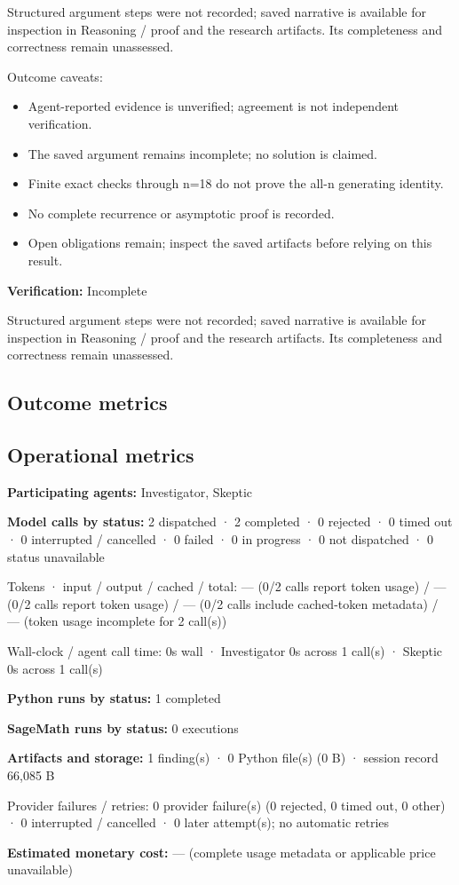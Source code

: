 \documentclass[11pt]{article}
\begin{document}
Structured argument steps were not recorded; saved narrative is available for inspection in Reasoning / proof and the research artifacts. Its completeness and correctness remain unassessed.\par
Outcome caveats:\par
\begin{itemize}
\item Agent-reported evidence is unverified; agreement is not independent verification.
\item The saved argument remains incomplete; no solution is claimed.
\item Finite exact checks through n=18 do not prove the all-n generating identity.
\item No complete recurrence or asymptotic proof is recorded.
\item Open obligations remain; inspect the saved artifacts before relying on this result.
\end{itemize}
\textbf{Verification:} Incomplete\par
Structured argument steps were not recorded; saved narrative is available for inspection in Reasoning / proof and the research artifacts. Its completeness and correctness remain unassessed.\par
\subsection{Outcome metrics}
\subsection{Operational metrics}
\textbf{Participating agents:} Investigator, Skeptic\par
\textbf{Model calls by status:} 2 dispatched · 2 completed · 0 rejected · 0 timed out · 0 interrupted / cancelled · 0 failed · 0 in progress · 0 not dispatched · 0 status unavailable\par
Tokens · input / output / cached / total: — (0/2 calls report token usage) / — (0/2 calls report token usage) / — (0/2 calls include cached-token metadata) / — (token usage incomplete for 2 call(s))\par
Wall-clock / agent call time: 0s wall · Investigator 0s across 1 call(s) · Skeptic 0s across 1 call(s)\par
\textbf{Python runs by status:} 1 completed\par
\textbf{SageMath runs by status:} 0 executions\par
\textbf{Artifacts and storage:} 1 finding(s) · 0 Python file(s) (0 B) · session record 66,085 B\par
Provider failures / retries: 0 provider failure(s) (0 rejected, 0 timed out, 0 other) · 0 interrupted / cancelled · 0 later attempt(s); no automatic retries\par
\textbf{Estimated monetary cost:} — (complete usage metadata or applicable price unavailable)\par
\end{document}
